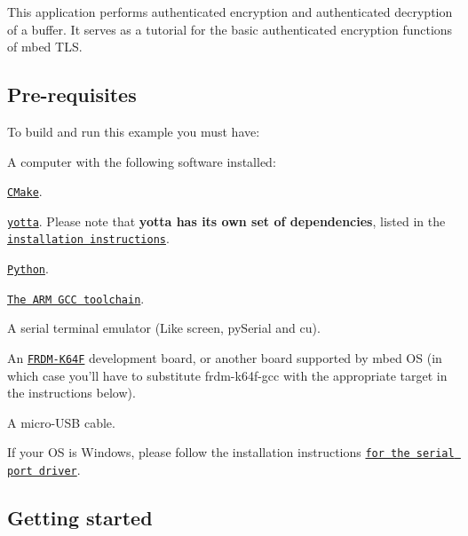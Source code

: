 This application performs authenticated encryption and authenticated decryption of a buffer. It serves as a tutorial for the basic authenticated encryption functions of mbed T\-L\-S.

\subsection*{Pre-\/requisites}

To build and run this example you must have\-:
\begin{DoxyItemize}
\item A computer with the following software installed\-:
\begin{DoxyItemize}
\item \href{http://www.cmake.org/download/}{\tt C\-Make}.
\item \href{https://github.com/ARMmbed/yotta}{\tt yotta}. Please note that {\bfseries yotta has its own set of dependencies}, listed in the \href{http://armmbed.github.io/yotta/#installing-on-windows}{\tt installation instructions}.
\item \href{https://www.python.org/downloads/}{\tt Python}.
\item \href{https://launchpad.net/gcc-arm-embedded}{\tt The A\-R\-M G\-C\-C toolchain}.
\item A serial terminal emulator (Like screen, py\-Serial and cu).
\end{DoxyItemize}
\item An \href{http://developer.mbed.org/platforms/FRDM-K64F/}{\tt F\-R\-D\-M-\/\-K64\-F} development board, or another board supported by mbed O\-S (in which case you'll have to substitute frdm-\/k64f-\/gcc with the appropriate target in the instructions below).
\item A micro-\/\-U\-S\-B cable.
\item If your O\-S is Windows, please follow the installation instructions \href{https://developer.mbed.org/handbook/Windows-serial-configuration}{\tt for the serial port driver}.
\end{DoxyItemize}

\subsection*{Getting started}


